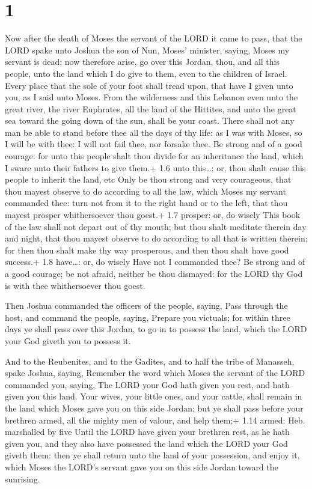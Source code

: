 \hypertarget{section}{%
\section{1}\label{section}}

 Now after the death of Moses the servant of the LORD it
came to pass, that the LORD spake unto Joshua the son of Nun, Moses'
minister, saying,  Moses my servant is dead; now therefore
arise, go over this Jordan, thou, and all this people, unto the land
which I do give to them, even to the children of Israel. 
Every place that the sole of your foot shall tread upon, that have I
given unto you, as I said unto Moses.  From the wilderness
and this Lebanon even unto the great river, the river Euphrates, all the
land of the Hittites, and unto the great sea toward the going down of
the sun, shall be your coast.  There shall not any man be
able to stand before thee all the days of thy life: as I was with Moses,
so I will be with thee: I will not fail thee, nor forsake thee.
 Be strong and of a good courage: for unto this people shalt
thou divide for an inheritance the land, which I sware unto their
fathers to give them.+ 1.6 unto this\ldots: or, thou shalt cause this
people to inherit the land, etc  Only be thou strong and
very courageous, that thou mayest observe to do according to all the
law, which Moses my servant commanded thee: turn not from it to the
right hand or to the left, that thou mayest prosper whithersoever thou
goest.+ 1.7 prosper: or, do wisely  This book of the law
shall not depart out of thy mouth; but thou shalt meditate therein day
and night, that thou mayest observe to do according to all that is
written therein: for then thou shalt make thy way prosperous, and then
thou shalt have good success.+ 1.8 have\ldots: or, do wisely
 Have not I commanded thee? Be strong and of a good courage;
be not afraid, neither be thou dismayed: for the LORD thy God is with
thee whithersoever thou goest.

 Then Joshua commanded the officers of the people,
saying,  Pass through the host, and command the people,
saying, Prepare you victuals; for within three days ye shall pass over
this Jordan, to go in to possess the land, which the LORD your God
giveth you to possess it.

 And to the Reubenites, and to the Gadites, and to half
the tribe of Manasseh, spake Joshua, saying,  Remember the
word which Moses the servant of the LORD commanded you, saying, The LORD
your God hath given you rest, and hath given you this land.
 Your wives, your little ones, and your cattle, shall
remain in the land which Moses gave you on this side Jordan; but ye
shall pass before your brethren armed, all the mighty men of valour, and
help them;+ 1.14 armed: Heb. marshalled by five  Until the
LORD have given your brethren rest, as he hath given you, and they also
have possessed the land which the LORD your God giveth them: then ye
shall return unto the land of your possession, and enjoy it, which Moses
the LORD's servant gave you on this side Jordan toward the sunrising.

